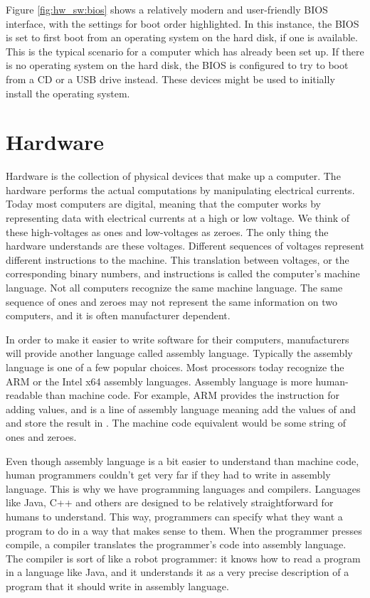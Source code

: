 Figure \ref{fig:hw_sw:bios} shows a relatively modern and user-friendly BIOS interface, with the settings for boot order highlighted. In this instance, the BIOS is set to first boot from an operating system on the hard disk, if one is available. This is the typical scenario for a computer which has already been set up. If there is no operating system on the hard disk, the BIOS is configured to try to boot from a CD or a USB drive instead. These devices might be used to initially install the operating system.

\section{Hardware}

Hardware is the collection of physical devices that make up a computer. The hardware performs the actual computations by manipulating electrical currents. Today most computers are digital, meaning that the computer works by representing data with electrical currents at a high or low voltage. We think of these high-voltages as ones and low-voltages as zeroes. The only thing the hardware understands are these voltages. Different sequences of voltages represent different instructions to the machine. This translation between voltages, or the corresponding binary numbers, and instructions is called the computer's machine language. Not all computers recognize the same machine language. The same sequence of ones and zeroes may not represent the same information on two computers, and it is often manufacturer dependent.

In order to make it easier to write software for their computers, manufacturers will provide another language called assembly language. Typically the assembly language is one of a few popular choices. Most processors today recognize the ARM or the Intel x64 assembly languages. Assembly language is more human-readable than machine code. For example, ARM provides the instruction  for adding values, and  is a line of assembly language meaning add the values of  and  and store the result in . The machine code equivalent would be some string of ones and zeroes.

Even though assembly language is a bit easier to understand than machine code, human programmers couldn't get very far if they had to write in assembly language. This is why we have programming languages and compilers. Languages like Java, C++ and others are designed to be relatively straightforward for humans to understand. This way, programmers can specify what they want a program to do in a way that makes sense to them. When the programmer presses compile, a compiler translates the programmer's code into assembly language. The compiler is sort of like a robot programmer: it knows how to read a program in a language like Java, and it understands it as a very precise description of a program that it should write in assembly language. 

